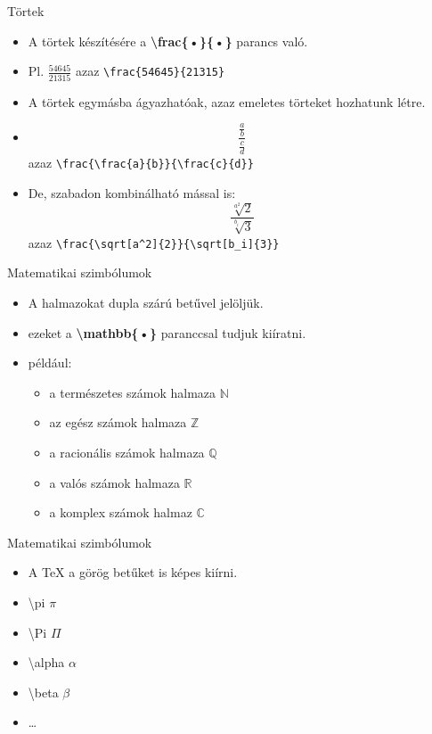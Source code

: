 \documentclass[11pt]{beamer}
\newcommand{\tbs}{\textbackslash}
\begin{document}
\begin{frame}[fragile]{Törtek}
\begin{itemize}
\item A törtek készítésére a \textbf{\tbs frac\{•\}\{•\}} parancs való.
\item Pl. $\frac{54645}{21315}$ azaz \verb|\frac{54645}{21315}|
\item A törtek egymásba ágyazhatóak, azaz emeletes törteket hozhatunk létre.
\item $$\frac{\frac{a}{b}}{\frac{c}{d}}$$ azaz \verb|\frac{\frac{a}{b}}{\frac{c}{d}}|
\item De, szabadon kombinálható mással is: $$\frac{\sqrt[a^2]{2}}{\sqrt[b_i]{3}}$$ azaz \verb|\frac{\sqrt[a^2]{2}}{\sqrt[b_i]{3}}|
\end{itemize}
\end{frame}

\begin{frame}{Matematikai szimbólumok}
\begin{itemize}
\item A halmazokat dupla szárú betűvel jelöljük.
\item ezeket a \textbf{\tbs mathbb\{•\}} paranccsal tudjuk kiíratni.
\item például:
	\begin{itemize}
	\item a természetes számok halmaza $\mathbb{N}$
	\item az egész számok halmaza $\mathbb{Z}$
	\item a racionális számok halmaza $\mathbb{Q}$
	\item a valós számok halmaza $\mathbb{R}$
	\item a komplex számok halmaz $\mathbb{C}$
	\end{itemize}
\end{itemize}
\end{frame}

\begin{frame}{Matematikai szimbólumok}
\begin{itemize}
\item A \TeX{} a görög betűket is képes kiírni.
\item \tbs pi $\pi$
\item \tbs Pi $\Pi$
\item \tbs alpha $\alpha$
\item \tbs beta $\beta$
\item \dots
\end{itemize}
\end{frame}
\end{document}
